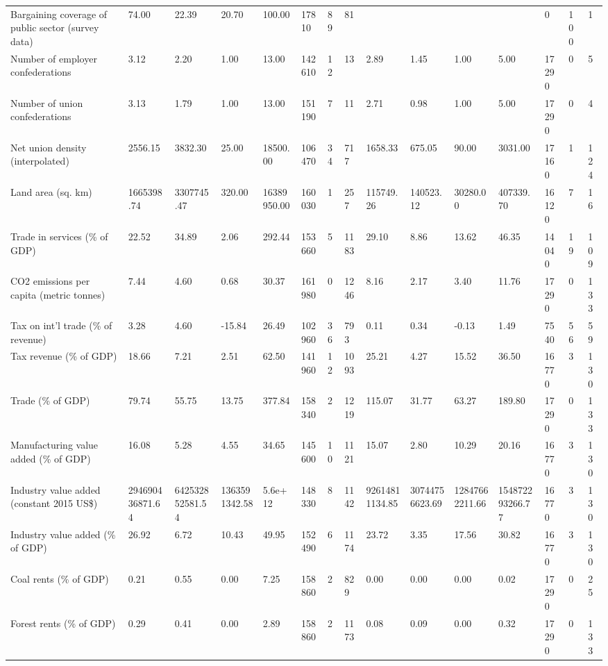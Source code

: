 \begin{longtable}{lllllllllllllll}
\addlinespace
Bargaining coverage of public sector (survey data) & 74.00 & 22.39 & 20.70 & 100.00 & 17810 & 89 & 81 &  &  &  &  & 0 & 100 & 1\\
Number of employer confederations & 3.12 & 2.20 & 1.00 & 13.00 & 142610 & 12 & 13 & 2.89 & 1.45 & 1.00 & 5.00 & 17290 & 0 & 5\\
Number of union confederations & 3.13 & 1.79 & 1.00 & 13.00 & 151190 & 7 & 11 & 2.71 & 0.98 & 1.00 & 5.00 & 17290 & 0 & 4\\
Net union density (interpolated) & 2556.15 & 3832.30 & 25.00 & 18500.00 & 106470 & 34 & 717 & 1658.33 & 675.05 & 90.00 & 3031.00 & 17160 & 1 & 124\\
Land area (sq. km) & 1665398.74 & 3307745.47 & 320.00 & 16389950.00 & 160030 & 1 & 257 & 115749.26 & 140523.12 & 30280.00 & 407339.70 & 16120 & 7 & 16\\
\addlinespace
Trade in services (\% of GDP) & 22.52 & 34.89 & 2.06 & 292.44 & 153660 & 5 & 1183 & 29.10 & 8.86 & 13.62 & 46.35 & 14040 & 19 & 109\\
CO2 emissions per capita (metric tonnes) & 7.44 & 4.60 & 0.68 & 30.37 & 161980 & 0 & 1246 & 8.16 & 2.17 & 3.40 & 11.76 & 17290 & 0 & 133\\
Tax on int'l trade (\% of revenue) & 3.28 & 4.60 & -15.84 & 26.49 & 102960 & 36 & 793 & 0.11 & 0.34 & -0.13 & 1.49 & 7540 & 56 & 59\\
Tax revenue (\% of GDP) & 18.66 & 7.21 & 2.51 & 62.50 & 141960 & 12 & 1093 & 25.21 & 4.27 & 15.52 & 36.50 & 16770 & 3 & 130\\
Trade (\% of GDP) & 79.74 & 55.75 & 13.75 & 377.84 & 158340 & 2 & 1219 & 115.07 & 31.77 & 63.27 & 189.80 & 17290 & 0 & 133\\
\addlinespace
Manufacturing value added (\% of GDP) & 16.08 & 5.28 & 4.55 & 34.65 & 145600 & 10 & 1121 & 15.07 & 2.80 & 10.29 & 20.16 & 16770 & 3 & 130\\
Industry value added (constant 2015 US\$) & 294690436871.64 & 642532852581.54 & 1363591342.58 & 5.6e+12 & 148330 & 8 & 1142 & 92614811134.85 & 30744756623.69 & 12847662211.66 & 154872293266.77 & 16770 & 3 & 130\\
Industry value added (\% of GDP) & 26.92 & 6.72 & 10.43 & 49.95 & 152490 & 6 & 1174 & 23.72 & 3.35 & 17.56 & 30.82 & 16770 & 3 & 130\\
Coal rents (\% of GDP) & 0.21 & 0.55 & 0.00 & 7.25 & 158860 & 2 & 829 & 0.00 & 0.00 & 0.00 & 0.02 & 17290 & 0 & 25\\
Forest rents (\% of GDP) & 0.29 & 0.41 & 0.00 & 2.89 & 158860 & 2 & 1173 & 0.08 & 0.09 & 0.00 & 0.32 & 17290 & 0 & 133\\

\end{longtable}

